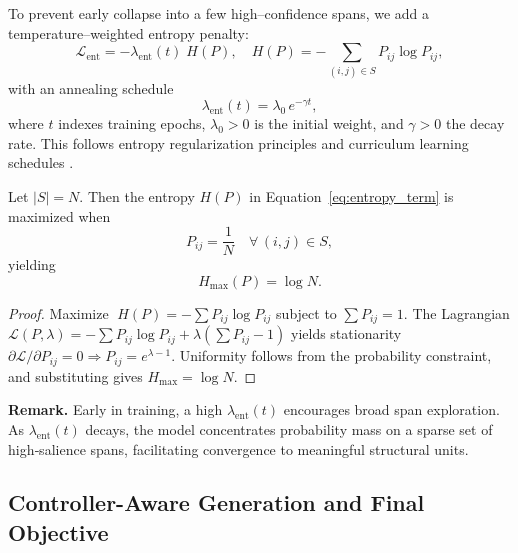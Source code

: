 To prevent early collapse into a few high–confidence spans, we add a temperature–weighted entropy penalty:
\begin{equation}
	\mathcal{L}_{\mathrm{ent}}
	= -\lambda_{\mathrm{ent}}(t)\;H(P),
	\quad
	H(P) = -\sum_{(i,j)\in S}P_{ij}\log P_{ij},
	\label{eq:entropy_term}
\end{equation}
with an annealing schedule
\begin{equation}
	\lambda_{\mathrm{ent}}(t)
	= \lambda_0\,e^{-\gamma t},
	\label{eq:entropy_decay}
\end{equation}
where \(t\) indexes training epochs, \(\lambda_0>0\) is the initial weight, and \(\gamma>0\) the decay rate.  This follows entropy regularization principles \cite{grandvalet2005semi,pereyra2017regularizing} and curriculum learning schedules \cite{bengio2009curriculum,kreutzer2021distilling}.

\begin{proposition}
	\label{prop:span_entropy_bound}
	Let \(|S|=N\).  Then the entropy \(H(P)\) in Equation~\eqref{eq:entropy_term} is maximized when
	\begin{equation}
		P_{ij} = \frac{1}{N}
		\quad\forall\,(i,j)\in S,
		\label{eq:uniform_P}
	\end{equation}
	yielding
	\begin{equation}
		H_{\max}(P) = \log N.
		\label{eq:max_entropy}
	\end{equation}
\end{proposition}
\begin{proof}
	Maximize 
	\(\;H(P)=-\sum P_{ij}\log P_{ij}\) 
	subject to \(\sum P_{ij}=1\).  The Lagrangian
	\(\mathcal{L}(P,\lambda)=-\sum P_{ij}\log P_{ij}+\lambda(\sum P_{ij}-1)\)
	yields stationarity \(\partial\mathcal{L}/\partial P_{ij}=0\Rightarrow P_{ij}=e^{\lambda-1}\).  Uniformity follows from the probability constraint, and substituting gives \(H_{\max}=\log N\).
\end{proof}

\noindent\textbf{Remark.} Early in training, a high \(\lambda_{\mathrm{ent}}(t)\) encourages broad span exploration.  As \(\lambda_{\mathrm{ent}}(t)\) decays, the model concentrates probability mass on a sparse set of high‐salience spans, facilitating convergence to meaningful structural units.

\subsection{Controller-Aware Generation and Final Objective}
\label{sec:controller-injection}

